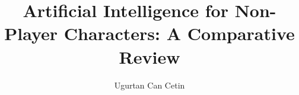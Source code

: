 \title{Artificial Intelligence for Non-Player Characters: A Comparative Review}
\author{Ugurtan Can Cetin}

